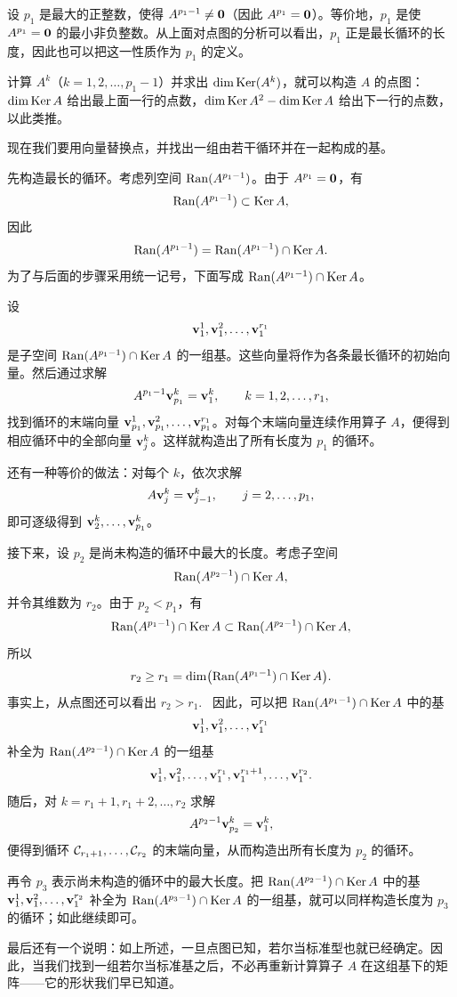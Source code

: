 设 $p_1$ 是最大的正整数，使得 $A^{p_1-1} \neq \mathbf{0}$（因此 $A^{p_1} = \mathbf{0}$）。等价地，$p_1$ 是使 $A^{p_1}=\mathbf{0}$ 的最小非负整数。从上面对点图的分析可以看出，$p_1$ 正是最长循环的长度，因此也可以把这一性质作为 $p_1$ 的定义。

计算 $A^k$（$k=1,2,\dots,p_1-1$）并求出 $\dim\operatorname{Ker}(A^k)$，就可以构造 $A$ 的点图：$\dim\operatorname{Ker} A$ 给出最上面一行的点数，$\dim\operatorname{Ker} A^2-\dim\operatorname{Ker} A$ 给出下一行的点数，以此类推。

现在我们要用向量替换点，并找出一组由若干循环并在一起构成的基。

先构造最长的循环。考虑列空间 $\operatorname{Ran}(A^{p_1-1})$。由于 $A^{p_1}=\mathbf{0}$，有
$$\operatorname{Ran}(A^{p_1-1})\subset\operatorname{Ker} A,$$
因此
$$\operatorname{Ran}(A^{p_1-1})=\operatorname{Ran}(A^{p_1-1})\cap\operatorname{Ker} A.$$
为了与后面的步骤采用统一记号，下面写成 $\operatorname{Ran}(A^{p_1-1})\cap\operatorname{Ker} A$。

设
$$\mathbf{v}^1_1,\mathbf{v}^2_1,\dots,\mathbf{v}^{r_1}_1$$
是子空间 $\operatorname{Ran}(A^{p_1-1})\cap\operatorname{Ker} A$ 的一组基。这些向量将作为各条最长循环的初始向量。然后通过求解
$$A^{p_1-1}\mathbf{v}^k_{p_1}=\mathbf{v}^k_1,\qquad k=1,2,\dots,r_1,$$
找到循环的末端向量 $\mathbf{v}^1_{p_1},\mathbf{v}^2_{p_1},\dots,\mathbf{v}^{r_1}_{p_1}$。对每个末端向量连续作用算子 $A$，便得到相应循环中的全部向量 $\mathbf{v}^k_j$。这样就构造出了所有长度为 $p_1$ 的循环。

还有一种等价的做法：对每个 $k$，依次求解
$$A\mathbf{v}^k_j=\mathbf{v}^k_{j-1},\qquad j=2,\dots,p_1,$$
即可逐级得到 $\mathbf{v}^k_2,\dots,\mathbf{v}^k_{p_1}$。

接下来，设 $p_2$ 是尚未构造的循环中最大的长度。考虑子空间
$$\operatorname{Ran}(A^{p_2-1})\cap\operatorname{Ker} A,$$
并令其维数为 $r_2$。由于 $p_2<p_1$，有
$$\operatorname{Ran}(A^{p_1-1})\cap\operatorname{Ker} A\subset\operatorname{Ran}(A^{p_2-1})\cap\operatorname{Ker} A,$$
所以
$$r_2\ge r_1=\dim\bigl(\operatorname{Ran}(A^{p_1-1})\cap\operatorname{Ker} A\bigr).$$
事实上，从点图还可以看出 $r_2>r_1$.~
因此，可以把 $\operatorname{Ran}(A^{p_1-1})\cap\operatorname{Ker} A$ 中的基
$$\mathbf{v}^1_1,\mathbf{v}^2_1,\dots,\mathbf{v}^{r_1}_1$$
补全为 $\operatorname{Ran}(A^{p_2-1})\cap\operatorname{Ker} A$ 的一组基
$$\mathbf{v}^1_1,\mathbf{v}^2_1,\dots,\mathbf{v}^{r_1}_1,\mathbf{v}^{r_1+1}_1,\dots,\mathbf{v}^{r_2}_1.$$
随后，对 $k=r_1+1,r_1+2,\dots,r_2$ 求解
$$A^{p_2-1}\mathbf{v}^k_{p_2}=\mathbf{v}^k_1,$$
便得到循环 $\mathcal{C}_{r_1+1},\dots,\mathcal{C}_{r_2}$ 的末端向量，从而构造出所有长度为 $p_2$ 的循环。

再令 $p_3$ 表示尚未构造的循环中的最大长度。把 $\operatorname{Ran}(A^{p_2-1})\cap\operatorname{Ker} A$ 中的基 $\mathbf{v}^1_1,\mathbf{v}^2_1,\dots,\mathbf{v}^{r_2}_1$ 补全为 $\operatorname{Ran}(A^{p_3-1})\cap\operatorname{Ker} A$ 的一组基，就可以同样构造长度为 $p_3$ 的循环；如此继续即可。

最后还有一个说明：如上所述，一旦点图已知，若尔当标准型也就已经确定。因此，当我们找到一组若尔当标准基之后，不必再重新计算算子 $A$ 在这组基下的矩阵——它的形状我们早已知道。


